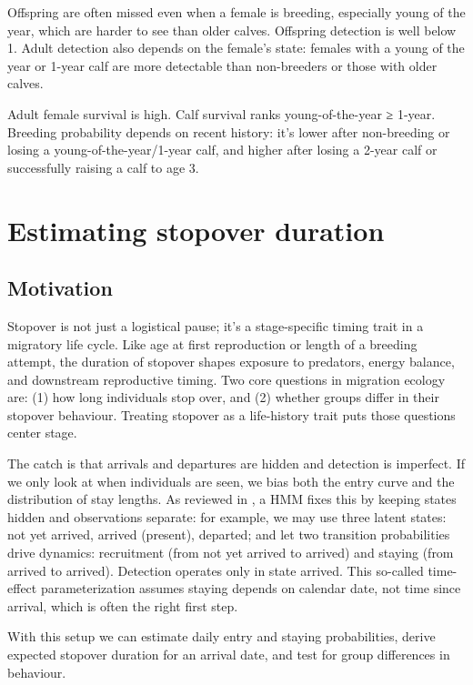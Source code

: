\documentclass[
  12pt,
]{krantz}
\begin{document}
Offspring are often missed even when a female is breeding, especially young of the year, which are harder to see than older calves. Offspring detection is well below 1. Adult detection also depends on the female's state: females with a young of the year or 1-year calf are more detectable than non-breeders or those with older calves.

Adult female survival is high. Calf survival ranks young-of-the-year ≥ 1-year. Breeding probability depends on recent history: it's lower after non-breeding or losing a young-of-the-year/1-year calf, and higher after losing a 2-year calf or successfully raising a calf to age 3.

\section{Estimating stopover duration}\label{estimating-stopover-duration}

\subsection{Motivation}\label{motivation-8}

Stopover is not just a logistical pause; it's a stage-specific timing trait in a migratory life cycle. Like age at first reproduction or length of a breeding attempt, the duration of stopover shapes exposure to predators, energy balance, and downstream reproductive timing. Two core questions in migration ecology are: (1) how long individuals stop over, and (2) whether groups differ in their stopover behaviour. Treating stopover as a life-history trait puts those questions center stage.

The catch is that arrivals and departures are hidden and detection is imperfect. If we only look at when individuals are seen, we bias both the entry curve and the distribution of stay lengths. As reviewed in \citet{guerin_advances_2017}, a HMM fixes this by keeping states hidden and observations separate: for example, we may use three latent states: not yet arrived, arrived (present), departed; and let two transition probabilities drive dynamics: recruitment (from not yet arrived to arrived) and staying (from arrived to arrived). Detection operates only in state arrived. This so-called time-effect parameterization assumes staying depends on calendar date, not time since arrival, which is often the right first step.

With this setup we can estimate daily entry and staying probabilities, derive expected stopover duration for an arrival date, and test for group differences in behaviour.
\end{document}
